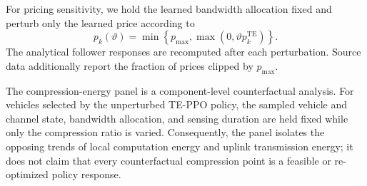 For pricing sensitivity, we hold the learned bandwidth allocation fixed and
perturb only the learned price according to
\begin{equation}
p_k(\vartheta)=\min\!\left\{p_{\max},
\max\!\left(0,\vartheta p_k^{\mathrm{TE}}\right)\right\}.
\end{equation}
The analytical follower responses are recomputed after each perturbation.
Source data additionally report the fraction of prices clipped by $p_{\max}$.

The compression-energy panel is a component-level counterfactual analysis.
For vehicles selected by the unperturbed TE-PPO policy, the sampled vehicle and
channel state, bandwidth allocation, and sensing duration are held fixed while
only the compression ratio is varied. Consequently, the panel isolates the
opposing trends of local computation energy and uplink transmission energy; it
does not claim that every counterfactual compression point is a feasible or
re-optimized policy response.
